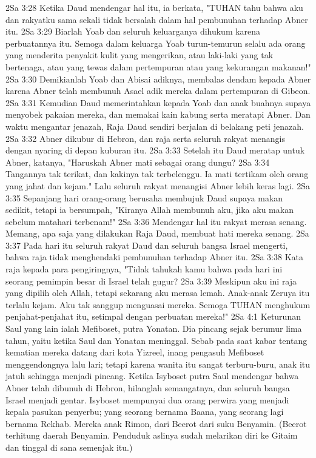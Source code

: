 2Sa 3:28  Ketika Daud mendengar hal itu, ia berkata, "TUHAN tahu bahwa aku dan rakyatku sama sekali tidak bersalah dalam hal pembunuhan terhadap Abner itu.
2Sa 3:29  Biarlah Yoab dan seluruh keluarganya dihukum karena perbuatannya itu. Semoga dalam keluarga Yoab turun-temurun selalu ada orang yang menderita penyakit kulit yang mengerikan, atau laki-laki yang tak bertenaga, atau yang tewas dalam pertempuran atau yang kekurangan makanan!"
2Sa 3:30  Demikianlah Yoab dan Abisai adiknya, membalas dendam kepada Abner karena Abner telah membunuh Asael adik mereka dalam pertempuran di Gibeon.
2Sa 3:31  Kemudian Daud memerintahkan kepada Yoab dan anak buahnya supaya menyobek pakaian mereka, dan memakai kain kabung serta meratapi Abner. Dan waktu mengantar jenazah, Raja Daud sendiri berjalan di belakang peti jenazah.
2Sa 3:32  Abner dikubur di Hebron, dan raja serta seluruh rakyat menangis dengan nyaring di depan kuburan itu.
2Sa 3:33  Setelah itu Daud meratap untuk Abner, katanya, "Haruskah Abner mati sebagai orang dungu?
2Sa 3:34  Tangannya tak terikat, dan kakinya tak terbelenggu. Ia mati tertikam oleh orang yang jahat dan kejam." Lalu seluruh rakyat menangisi Abner lebih keras lagi.
2Sa 3:35  Sepanjang hari orang-orang berusaha membujuk Daud supaya makan sedikit, tetapi ia bersumpah, "Kiranya Allah membunuh aku, jika aku makan sebelum matahari terbenam!"
2Sa 3:36  Mendengar hal itu rakyat merasa senang. Memang, apa saja yang dilakukan Raja Daud, membuat hati mereka senang.
2Sa 3:37  Pada hari itu seluruh rakyat Daud dan seluruh bangsa Israel mengerti, bahwa raja tidak menghendaki pembunuhan terhadap Abner itu.
2Sa 3:38  Kata raja kepada para pengiringnya, "Tidak tahukah kamu bahwa pada hari ini seorang pemimpin besar di Israel telah gugur?
2Sa 3:39  Meskipun aku ini raja yang dipilih oleh Allah, tetapi sekarang aku merasa lemah. Anak-anak Zeruya itu terlalu kejam. Aku tak sanggup menguasai mereka. Semoga TUHAN menghukum penjahat-penjahat itu, setimpal dengan perbuatan mereka!"
2Sa 4:1  Keturunan Saul yang lain ialah Mefiboset, putra Yonatan. Dia pincang sejak berumur lima tahun, yaitu ketika Saul dan Yonatan meninggal. Sebab pada saat kabar tentang kematian mereka datang dari kota Yizreel, inang pengasuh Mefiboset menggendongnya lalu lari; tetapi karena wanita itu sangat terburu-buru, anak itu jatuh sehingga menjadi pincang. Ketika Isyboset putra Saul mendengar bahwa Abner telah dibunuh di Hebron, hilanglah semangatnya, dan seluruh bangsa Israel menjadi gentar. Isyboset mempunyai dua orang perwira yang menjadi kepala pasukan penyerbu; yang seorang bernama Baana, yang seorang lagi bernama Rekhab. Mereka anak Rimon, dari Beerot dari suku Benyamin. (Beerot terhitung daerah Benyamin. Penduduk aslinya sudah melarikan diri ke Gitaim dan tinggal di sana semenjak itu.)
